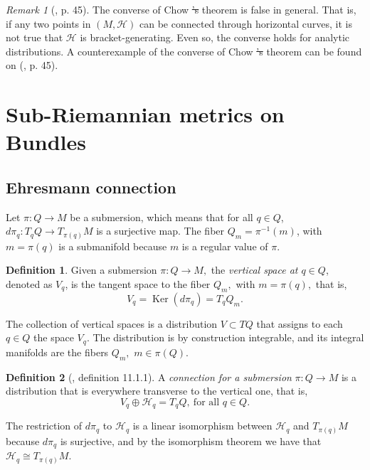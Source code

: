 \documentclass[12pt, letterpaper, reqno]{amsart}
\theoremstyle{definition}
\newtheorem{df}{Definition}
\theoremstyle{plain}
\theoremstyle{remark}
\newtheorem{rem}{Remark}
\providecommand{\DIFdel}[1]{{\protect\color{red}\sout{#1}}}                      %
\providecommand{\DIFdelbegin}{} %
\providecommand{\DIFdelend}{} %
\newcommand{\DIFscaledelfig}{0.5}
\newlength{\DIFdelgraphicswidth} %
\newlength{\DIFdelgraphicsheight} %
\newcommand{\DIFdelincludegraphics}[2][]{%
\sbox{\DIFdelgraphicsbox}{\DIFOincludegraphics[#1]{#2}}%
\settoboxwidth{\DIFdelgraphicswidth}{\DIFdelgraphicsbox} %
\settoboxtotalheight{\DIFdelgraphicsheight}{\DIFdelgraphicsbox} %
\scalebox{\DIFscaledelfig}{%
\parbox[b]{\DIFdelgraphicswidth}{\usebox{\DIFdelgraphicsbox}\\[-\baselineskip] \rule{\DIFdelgraphicswidth}{0em}}\llap{\resizebox{\DIFdelgraphicswidth}{\DIFdelgraphicsheight}{%
\setlength{\unitlength}{\DIFdelgraphicswidth}%
\begin{picture}(1,1)%
\thicklines\linethickness{2pt} %
{\color[rgb]{1,0,0}\put(0,0){\framebox(1,1){}}}%
{\color[rgb]{1,0,0}\put(0,0){\line( 1,1){1}}}%
{\color[rgb]{1,0,0}\put(0,1){\line(1,-1){1}}}%
\end{picture}%
}\hspace*{3pt}}} %
} %
\DeclareRobustCommand{\DIFdelbegin}{\DIFOdelbegin \let\includegraphics\DIFdelincludegraphics} %
\DeclareRobustCommand{\DIFdelend}{\DIFOaddend \let\includegraphics\DIFOincludegraphics} %
\begin{document}
\begin{rem}[\cite{montgomery2002tour}, p. 45]
	The converse of Chow \DIFdelbegin \DIFdel{'s }\DIFdelend theorem is false in general. That is, if any two points in $ (M,\mathcal{H}) $ can be connected through horizontal curves, it is not true that $ \mathcal{H} $ is bracket-generating. Even so, the converse holds for analytic distributions. A counterexample of  the converse of Chow \DIFdelbegin \DIFdel{'s }\DIFdelend theorem can be found on (\cite{montgomery2002tour}, p. 45).
\end{rem}
\section{Sub-Riemannian metrics on Bundles}%
\label{sec:metrics_on_bundles}
\subsection{Ehresmann connection}%
\label{sub:ehresmann_connection}


Let $ \pi : Q \rightarrow {M} $ be a submersion, which means that for all $ q\in Q $, $ d\pi_q : T_q Q \rightarrow {T_{\pi(q)}}M $ is a surjective map. The fiber $ Q_m = \pi^{-1}(m) $, with $ m=\pi(q) $ is a submanifold because $ m $ is a regular value of $ \pi. $  

\begin{df}
	Given a submersion $ \pi:Q \rightarrow {M}, $ the \textit{vertical space at $ q\in Q $}, denoted as $ V_q $, is the tangent space to the fiber $ Q_m, $ with $ m=\pi(q), $ that is,  
	$$ V_q = \operatorname{Ker}(d\pi_q) = T_q Q_m.  $$ 
\end{df}

The collection of vertical spaces is a distribution $ V \subset TQ $ that assigns to each $ q\in Q $ the space $ V_q. $ The distribution is by construction integrable, and its integral manifolds are the fibers $ Q_m, $ $ m\in \pi(Q). $ 

\begin{df}[\cite{montgomery2002tour}, definition 11.1.1]
	A \textit{connection for a submersion} $ \pi:Q \rightarrow {M} $ is a distribution that is everywhere transverse to the vertical one, that is,  
	$$ V_q \oplus \mathcal{H}_q = T_q Q,\ \text{for all } q\in Q. $$ 
\end{df}

The restriction of $ d\pi_q $ to $ \mathcal{H}_q $ is a linear isomorphism between $ \mathcal{H}_q $ and $ T_{\pi(q)} M $  because $ d\pi_q $ is surjective, and by the isomorphism theorem we have that $ \mathcal{H}_q\cong T_{\pi(q)} M $. 
\end{document}
